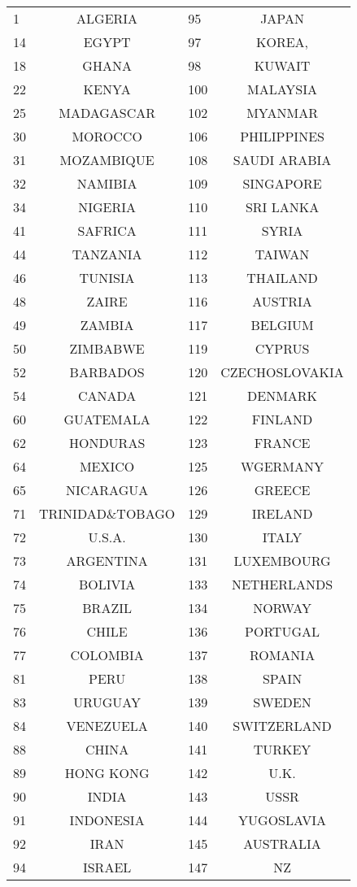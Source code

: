 \documentclass{scrartcl}
\begin{document}
\begin{table}[h!]
\begin{center}
\begin{tabular}{|l|c|l|c|}
1 & ALGERIA     &       95  &JAPAN       \\
14& EGYPT       &       97  &KOREA,      \\
18& GHANA       &       98  &KUWAIT      \\
22& KENYA       &       100 &MALAYSIA    \\
25& MADAGASCAR  &       102 &MYANMAR    \\
30& MOROCCO     &       106 &PHILIPPINES     \\
31& MOZAMBIQUE  &       108 &SAUDI ARABIA    \\
32& NAMIBIA     &       109 &SINGAPORE   \\
34& NIGERIA     &       110 &SRI LANKA   \\
41& SAFRICA     &       111 &SYRIA       \\
44& TANZANIA    &       112 &TAIWAN      \\
46& TUNISIA     &       113 &THAILAND    \\
48& ZAIRE       &       116 &AUSTRIA     \\
49& ZAMBIA      &       117 &BELGIUM    \\
50& ZIMBABWE    &       119 &CYPRUS      \\
52& BARBADOS    &       120 &CZECHOSLOVAKIA  \\
54& CANADA      &       121 &DENMARK     \\
60& GUATEMALA   &       122 &FINLAND    \\
62& HONDURAS    &       123 &FRANCE      \\
64& MEXICO      &       125 &WGERMANY    \\
65& NICARAGUA   &       126 &GREECE      \\
71& TRINIDAD\&TOBAGO&       129 &IRELAND    \\
72& U.S.A.      &       130 &ITALY       \\
73& ARGENTINA   &       131 &LUXEMBOURG  \\
74& BOLIVIA     &       133 &NETHERLANDS     \\
75& BRAZIL      &       134 &NORWAY      \\
76& CHILE       &       136 &PORTUGAL    \\
77& COLOMBIA    &       137 &ROMANIA    \\
81& PERU        &       138 &SPAIN       \\
83& URUGUAY     &       139 &SWEDEN      \\
84& VENEZUELA   &       140 &SWITZERLAND     \\
88& CHINA       &       141 &TURKEY      \\
89& HONG KONG   &       142 &U.K.        \\
90& INDIA       &       143 &USSR        \\
91& INDONESIA   &       144 &YUGOSLAVIA  \\
92& IRAN        &       145 &AUSTRALIA   \\
94& ISRAEL      &       147 &NZ      \\
\hline
\end{tabular}
\end{center}
\end{table}



\end{document}
